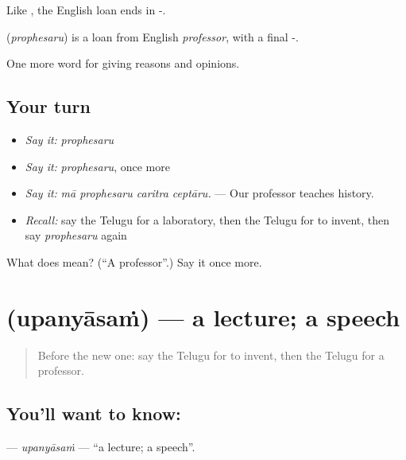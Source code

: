 Like , the English loan ends in -.

\begin{cousinweb}
\textbf{} (\emph{prophesaru}) is a loan from English \emph{professor}, with a final -.
\end{cousinweb}

\begin{grammarlens}[title={What you've built}]
One more word for giving reasons and opinions.
\end{grammarlens}

\subsection*{Your turn}
\begin{itemize}
\raggedright
  \item \emph{Say it:} \emph{prophesaru}
  \item \emph{Say it:} \emph{prophesaru}, once more
  \item \emph{Say it:} \emph{mā prophesaru caritra ceptāru.} — Our professor teaches history.
  \item \emph{Recall:} say the Telugu for a laboratory, then the Telugu for to invent, then say \emph{prophesaru} again
\end{itemize}

\begin{tcolorbox}[breakable,colback=teal!4,colframe=teal!35!black,title={Before you move on}]
What does  mean? (\textquotedblleft{}A professor\textquotedblright{}.) Say it once more.
\end{tcolorbox}
\section[\texorpdfstring{\te{ఉపన్యాసం} (upanyāsaṁ)}{ఉపన్యాసం (upanyāsaṁ)}]{ (upanyāsaṁ) — a lecture; a speech}

\label{lesson:TE-C414-upanyasam}



\begin{quote}
Before the new one: say the Telugu for to invent, then the Telugu for a professor.
\end{quote}

\subsection*{You'll want to know: }
\textbf{} — \emph{upanyāsaṁ} — \textquotedblleft{}a lecture; a speech\textquotedblright{}.

